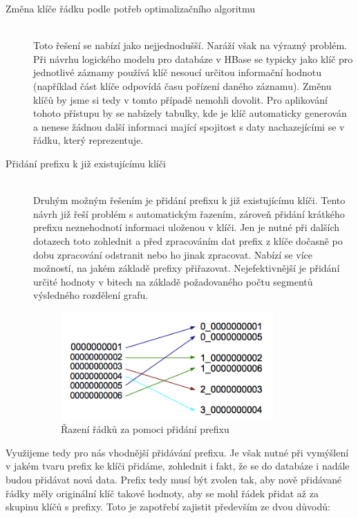 \documentclass[thesis=M,czech]{FITthesis}[2012/06/26]
\begin{document}
\begin{description}
\item[Změna klíče řádku podle potřeb optimalizačního algoritmu] \hfill \\
 Toto řešení se nabízí jako nejjednodušší. Naráží však na výrazný problém. Při návrhu logického modelu pro databáze v HBase se typicky jako klíč pro jednotlivé záznamy používá klíč nesoucí určitou informační hodnotu (například část klíče odpovídá času pořízení daného záznamu). Změnu klíčů by jsme si tedy v tomto případě nemohli dovolit. Pro aplikování tohoto přístupu by se nabízely tabulky, kde je klíč automaticky generován a nenese žádnou další informaci mající spojitost s daty nachazejícími se v řádku, který reprezentuje.
 
 \item[Přidání prefixu k již existujícímu klíči] \hfill \\
 Druhým možným řešením je přidání prefixu k již existujícímu klíči. Tento návrh již řeší problém s automatickým řazením, zároveň přidání krátkého prefixu neznehodnotí informaci uloženou v klíči. Jen je nutné při dalších dotazech toto zohlednit a před zpracováním dat prefix z klíče dočasně po dobu zpracování odstranit nebo ho jinak zpracovat. Nabízí se více možností, na jakém základě prefixy přiřazovat. Nejefektivnější je přidání určité hodnoty v bitech na základě požadovaného počtu segmentů výsledného rozdělení grafu. 
 
 \begin{figure}[h]\centering
	\includegraphics[width=0.8\textwidth, angle=0]{files/rows}
	\caption[Řazení řádků za pomoci přidání prefixu]
	{Řazení řádků za pomoci přidání prefixu}\label{fig:keys}
\end{figure} 
 
\end{description} 

Využijeme tedy pro nás vhodnější přidávání prefixu. Je však nutné při vymýšlení v jakém tvaru prefix ke klíči přidáme, zohlednit i fakt, že se do databáze i nadále budou přidávat nová data. Prefix tedy musí být zvolen tak, aby nově přidávané řádky měly originální klíč takové hodnoty, aby se mohl řádek přidat až za skupinu klíčů s prefixy. Toto je zapotřebí zajistit především ze dvou důvodů:
\end{document}
